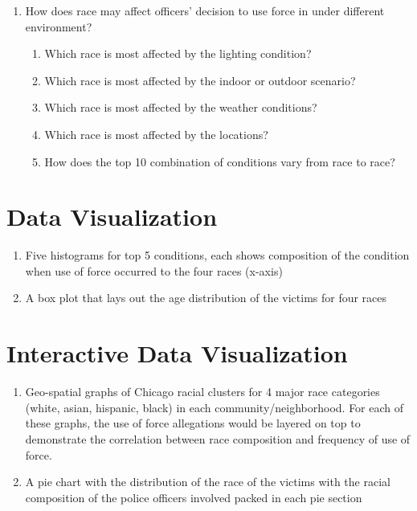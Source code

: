 \documentclass[10pt]{article}
\begin{document}
\begin{enumerate}
\item How does race may affect officers’ decision to use force in under different environment?

    \begin{enumerate}

    \item Which race is most affected by the lighting condition?

    \item Which race is most affected by the indoor or outdoor scenario?

    \item Which race is most affected by the weather conditions?

    \item Which race is most affected by the locations?

    \item How does the top 10 combination of conditions vary from race to race?

    \end{enumerate}

\end{enumerate}





\section{Data Visualization}

\begin{enumerate}

\item Five histograms for top 5 conditions, each shows composition of the condition when use of force occurred to the four races (x-axis)

\item A box plot that lays out the age distribution of the victims for four races

\end{enumerate}



\section{Interactive Data Visualization}

\begin{enumerate}

\item Geo-spatial graphs of Chicago racial clusters for 4 major race categories (white, asian, hispanic, black) in each community/neighborhood. For each of these graphs, the use of force allegations would be layered on top to demonstrate the correlation between race composition and frequency of use of force.

\item A pie chart with the distribution of the race of the victims with the racial composition of the police officers involved packed in each pie section

\end{enumerate}
\end{document}
